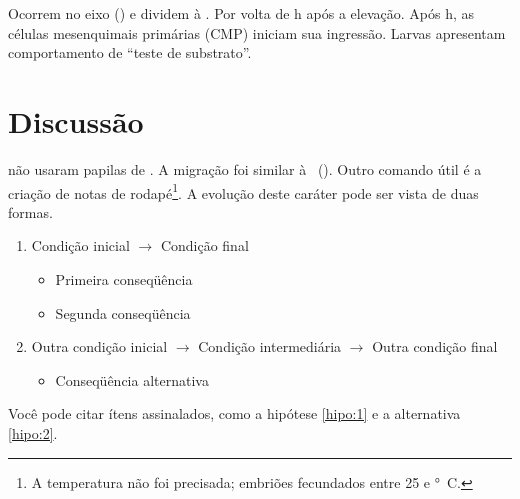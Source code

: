 Ocorrem no eixo  () e dividem à .
Por volta de \unit[7,5]{h} após a elevação.
Após \unit[10]{h}, as células mesenquimais primárias (CMP) iniciam sua ingressão.%
Larvas apresentam comportamento de ``teste de substrato''.

\section{Discussão}\label{cap2:disc}

\citet{Day2006} não usaram papilas de \subdeshort.
A migração foi similar à \subde\ ().
Outro comando útil é a criação de notas de rodapé\footnote{A temperatura não foi precisada; embriões fecundados entre 25 e \unit[28]{°C}.}.
A evolução deste caráter pode ser vista de duas formas.

\begin{enumerate}
  \item{Condição inicial $\longrightarrow$ Condição final}\label{hipo:1}
    \begin{itemize}
      \item{Primeira conseqüência}
      \item{Segunda conseqüência}
    \end{itemize}
  \item{Outra condição inicial $\longrightarrow$ Condição intermediária $\longrightarrow$ Outra condição final}\label{hipo:2}
    \begin{itemize}
      \item{Conseqüência alternativa}
    \end{itemize}
\end{enumerate}

Você pode citar ítens assinalados, como a hipótese \ref{hipo:1} e a alternativa \ref{hipo:2}.

